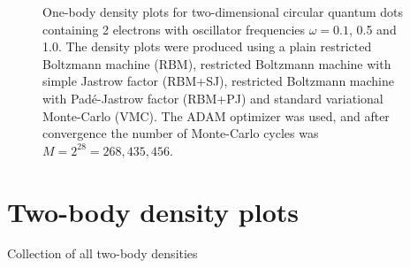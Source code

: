 \begin{landscape}
\begin{figure} [H]
		\caption{One-body density plots for two-dimensional circular quantum dots containing 2 electrons with oscillator frequencies $\omega=0.1$, 0.5 and 1.0. The density plots were produced using a plain restricted Boltzmann machine (RBM), restricted Boltzmann machine with simple Jastrow factor (RBM+SJ), restricted Boltzmann machine with Padé-Jastrow factor (RBM+PJ) and standard variational Monte-Carlo (VMC). The  ADAM optimizer was used, and after convergence the number of Monte-Carlo cycles was $M=2^{28}=268,435,456$.}%
		\label{fig:OB2_interaction_2D}
	\end{figure}
\end{landscape}

\section{Two-body density plots} \label{sec:twobody}
Collection of all two-body densities
